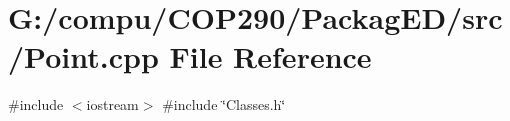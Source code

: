 \section{G\+:/compu/\+C\+O\+P290/\+Packag\+E\+D/src/\+Point.cpp File Reference}
\label{_point_8cpp}
{\ttfamily \#include $<$iostream$>$}\newline
{\ttfamily \#include \char`\"{}Classes.\+h\char`\"{}}\newline
